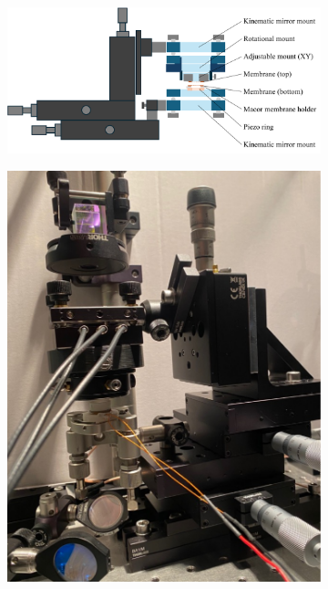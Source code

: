 \begin{figure}[h!]
    \centering
    \begin{subfigure}[b]{0.74\textwidth}
        \includegraphics[width=\textwidth]{figures/setup_skecth_zoomed.pdf}
        \caption{}
        \label{fig:setup_zoomed}
    \end{subfigure}
    \begin{subfigure}[b]{0.25\textwidth}
        \includegraphics[width=\textwidth]{figures/setup_cavity_picture.pdf}

\end{subfigure}
\end{figure}

